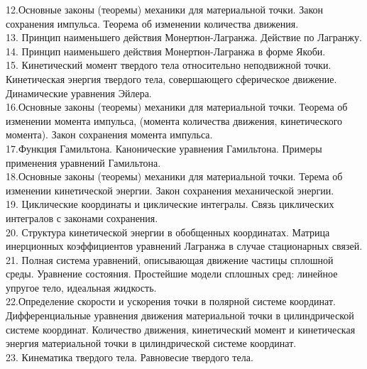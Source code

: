\documentclass[a4paper, 12pt]{report}
\begin{document}
	12.Основные законы (теоремы) механики для материальной точки. Закон
	сохранения импульса. Теорема об изменении количества движения.\\

	13. Принцип наименьшего действия Монертюн-Лагранжа. Действие по
	Лагранжу.\\

	14. Принцип наименьшего действия Монертюн-Лагранжа в форме Якоби.\\

	15. Кинетический момент твердого тела относительно неподвижной точки.
	Кинетическая энергия твердого тела, совершающего сферическое
	движение. Динамические уравнения Эйлера.\\

	16.Основные законы (теоремы) механики для материальной точки.
	Теорема об изменении момента импульса, (момента количества
	движения, кинетического момента). Закон сохранения момента
	импульса.\\

	17.Функция Гамильтона. Канонические уравнения Гамильтона. Примеры
	применения уравнений Гамильтона.\\

	18.Основные законы (теоремы) механики для материальной точки. Терема
	об изменении кинетической энергии. Закон сохранения механической
	энергии.\\

	19. Циклические координаты и циклические интегралы. Связь циклических интегралов 
	с законами сохранения.\\

	20. Структура кинетической энергии в обобщенных координатах. Матрица
	инерционных коэффициентов уравнений Лагранжа в случае
	стационарных связей.\\

	21. Полная система уравнений, описывающая движение частицы
	сплошной среды. Уравнение состояния. Простейшие модели сплошных
	сред: линейное упругое тело, идеальная жидкость.\\

	22.Определение скорости и ускорения точки в полярной системе
	координат. Дифференциальные уравнения движения материальной
	точки в цилиндрической системе координат. Количество движения,
	кинетический момент и кинетическая энергия материальной точки в
	цилиндрической системе координат.\\

	23. Кинематика твердого тела. Равновесие твердого тела.\\
\end{document}
